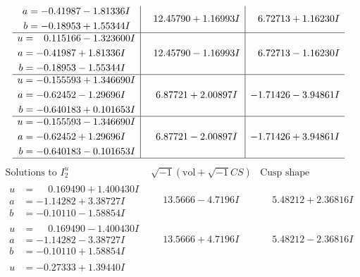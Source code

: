 \documentclass[1p]{elsarticle_modified}
\theoremstyle{definition}
\newcommand{\I}{\sqrt{-1}}
\begin{document}
$$\begin{array}{c|c|c}
\begin{aligned}
a &= -0.41987 - 1.81336 I \\
b &= -0.18953 + 1.55344 I\end{aligned}
 & \phantom{-}12.45790 + 1.16993 I & \phantom{-}6.72713 + 1.16230 I \\ \hline\begin{aligned}
u &= \phantom{-}0.115166 - 1.323600 I \\
a &= -0.41987 + 1.81336 I \\
b &= -0.18953 - 1.55344 I\end{aligned}
 & \phantom{-}12.45790 - 1.16993 I & \phantom{-}6.72713 - 1.16230 I \\ \hline\begin{aligned}
u &= -0.155593 + 1.346690 I \\
a &= -0.62452 - 1.29696 I \\
b &= -0.640183 + 0.101653 I\end{aligned}
 & \phantom{-}6.87721 + 2.00897 I & -1.71426 - 3.94861 I \\ \hline\begin{aligned}
u &= -0.155593 - 1.346690 I \\
a &= -0.62452 + 1.29696 I \\
b &= -0.640183 - 0.101653 I\end{aligned}
 & \phantom{-}6.87721 - 2.00897 I & -1.71426 + 3.94861 I\\
 \hline 
 \end{array}$$\newpage$$\begin{array}{c|c|c}  
\text{Solutions to }I^u_{2}& \I (\text{vol} + \sqrt{-1}CS) & \text{Cusp shape}\\
 \hline 
\begin{aligned}
u &= \phantom{-}0.169490 + 1.400430 I \\
a &= -1.14282 + 3.38727 I \\
b &= -0.10110 - 1.58854 I\end{aligned}
 & \phantom{-}13.5666 - 4.7196 I & \phantom{-}5.48212 + 2.36816 I \\ \hline\begin{aligned}
u &= \phantom{-}0.169490 - 1.400430 I \\
a &= -1.14282 - 3.38727 I \\
b &= -0.10110 + 1.58854 I\end{aligned}
 & \phantom{-}13.5666 + 4.7196 I & \phantom{-}5.48212 - 2.36816 I \\ \hline\begin{aligned}
u &= -0.27333 + 1.39440 I \\

\end{aligned}
\end{array}$$
\end{document}

